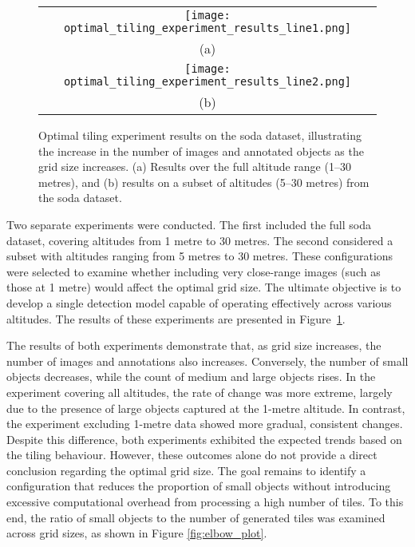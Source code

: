 \begin{figure}[!ht]
  \centering
  \begin{tabular}{c}
    \texttt{[image: optimal\_tiling\_experiment\_results\_line1.png]} \\
    \small (a) \\
    \addlinespace[1em]
    \texttt{[image: optimal\_tiling\_experiment\_results\_line2.png]} \\
    \small (b) \\
  \end{tabular}
  \caption{Optimal tiling experiment results on the \gls{soda} dataset, illustrating the increase in the number of images and annotated objects as the grid size increases. (a) Results over the full altitude range (1--30 metres), and (b) results on a subset of altitudes (5--30 metres) from the \gls{soda} dataset.}
  \label{fig:optimal_tiling_line}
\end{figure}

Two separate experiments were conducted. The first included the full \gls{soda} dataset, covering altitudes from 1 metre to 30 metres. The second considered a subset with altitudes ranging from 5 metres to 30 metres. These configurations were selected to examine whether including very close-range images (such as those at 1 metre) would affect the optimal grid size. The ultimate objective is to develop a single detection model capable of operating effectively across various altitudes. The results of these experiments are presented in Figure~\ref{fig:optimal_tiling_line}.

The results of both experiments demonstrate that, as grid size increases, the number of images and annotations also increases. Conversely, the number of small objects decreases, while the count of medium and large objects rises. In the experiment covering all altitudes, the rate of change was more extreme, largely due to the presence of large objects captured at the 1-metre altitude. In contrast, the experiment excluding 1-metre data showed more gradual, consistent changes. Despite this difference, both experiments exhibited the expected trends based on the tiling behaviour.
However, these outcomes alone do not provide a direct conclusion regarding the optimal grid size. The goal remains to identify a configuration that reduces the proportion of small objects without introducing excessive computational overhead from processing a high number of tiles. To this end, the ratio of small objects to the number of generated tiles was examined across grid sizes, as shown in Figure \ref{fig:elbow_plot}.

